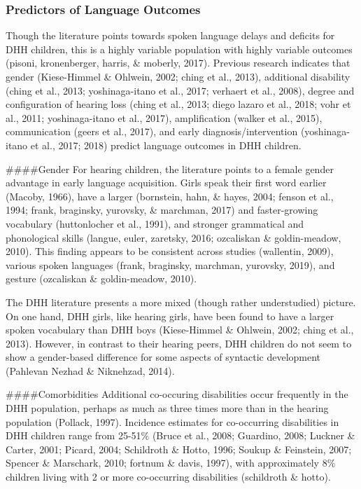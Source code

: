 \documentclass[
]{article}
\begin{document}
\hypertarget{predictors-of-language-outcomes}{%
\subsubsection{Predictors of Language
Outcomes}\label{predictors-of-language-outcomes}}

Though the literature points towards spoken language delays and deficits
for DHH children, this is a highly variable population with highly
variable outcomes (pisoni, kronenberger, harris, \& moberly, 2017).
Previous research indicates that gender (Kiese-Himmel \& Ohlwein, 2002;
ching et al., 2013), additional disability (ching et al., 2013;
yoshinaga-itano et al., 2017; verhaert et al., 2008), degree and
configuration of hearing loss (ching et al., 2013; diego lazaro et al.,
2018; vohr et al., 2011; yoshinaga-itano et al., 2017), amplification
(walker et al., 2015), communication (geers et al., 2017), and early
diagnosis/intervention (yoshinaga-itano et al., 2017; 2018) predict
language outcomes in DHH children.

\#\#\#\#Gender For hearing children, the literature points to a female
gender advantage in early language acquisition. Girls speak their first
word earlier (Macoby, 1966), have a larger (bornstein, hahn, \& hayes,
2004; fenson et al., 1994; frank, braginsky, yurovsky, \& marchman,
2017) and faster-growing vocabulary (huttonlocher et al., 1991), and
stronger grammatical and phonological skills (langue, euler, zaretsky,
2016; ozcaliskan \& goldin-meadow, 2010). This finding appears to be
consistent across studies (wallentin, 2009), various spoken languages
(frank, braginsky, marchman, yurovsky, 2019), and gesture (ozcaliskan \&
goldin-meadow, 2010).

The DHH literature presents a more mixed (though rather understudied)
picture. On one hand, DHH girls, like hearing girls, have been found to
have a larger spoken vocabulary than DHH boys (Kiese-Himmel \& Ohlwein,
2002; ching et al., 2013). However, in contrast to their hearing peers,
DHH children do not seem to show a gender-based difference for some
aspects of syntactic development (Pahlevan Nezhad \& Niknehzad, 2014).

\#\#\#\#Comorbidities Additional co-occuring disabilities occur
frequently in the DHH population, perhaps as much as three times more
than in the hearing population (Pollack, 1997). Incidence estimates for
co-occurring disabilities in DHH children range from 25-51\% (Bruce et
al., 2008; Guardino, 2008; Luckner \& Carter, 2001; Picard, 2004;
Schildroth \& Hotto, 1996; Soukup \& Feinstein, 2007; Spencer \&
Marschark, 2010; fortnum \& davis, 1997), with approximately 8\%
children living with 2 or more co-occurring disabilities (schildroth \&
hotto).
\end{document}
